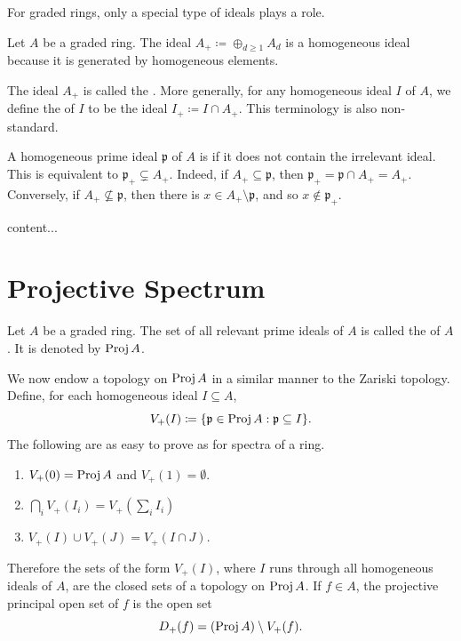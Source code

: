 For graded rings, only a special type of ideals plays a role.

\begin{remark}
	Let $A$ be a graded ring. The ideal $A_+ \coloneqq \oplus_{d \geq 1} A_d$ is a homogeneous ideal because it is generated by homogeneous elements.
\end{remark}

The ideal $A_+$ is called the . More generally, for any homogeneous ideal $I$ of $A$, we define the  of $I$ to be the ideal $I_+ \coloneqq I \cap A_+$. This terminology is also non-standard.

A homogeneous prime ideal $\mathfrak{p}$ of $A$ is  if it does not contain the irrelevant ideal. This is equivalent to $\mathfrak{p}_+ \subsetneq A_+$. Indeed, if $A_+ \subseteq \mathfrak{p}$, then $\mathfrak{p}_+ = \mathfrak{p} \cap A_+ = A_+$. Conversely, if $A_+ \not\subseteq \mathfrak{p}$, then there is $x \in A_+ \setminus \mathfrak{p}$, and so $x \notin \mathfrak{p}_+$.

\begin{proposition}
	content...
\end{proposition}

\section{Projective Spectrum}

\begin{definition}
	Let $A$ be a graded ring. The set of all relevant prime ideals of $A$ is called the  of $A$. It is denoted by $\operatorname{Proj} A$.
\end{definition}

We now endow a topology on $\operatorname{Proj} A$ in a similar manner to the Zariski topology. Define, for each homogeneous ideal $I \subseteq A$,
\begin{equation*}
	V_+(I) \coloneqq \Set*{\mathfrak{p} \in \Proj A : \mathfrak{p} \subseteq I}.
\end{equation*}
The following are as easy to prove as for spectra of a ring.
\begin{enumerate}
	\item $V_+(0) = \operatorname{Proj} A$ and $V_+(1) = \emptyset$.
	\item $\bigcap_i V_+(I_i) = V_+(\sum_i I_i)$
	\item $V_+(I) \cup V_+(J) = V_+(I \cap J)$.
\end{enumerate}
Therefore the sets of the form $V_+(I)$, where $I$ runs through all homogeneous ideals of $A$, are the closed sets of a topology on $\operatorname{Proj} A$. If $f \in A$, the projective principal open set of $f$ is the open set 
\begin{equation*}
	D_+(f) = (\operatorname{Proj} A) \setminus V_+(f).
\end{equation*}

